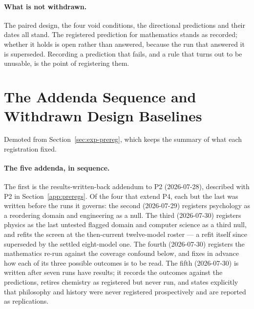 \paragraph{What is not withdrawn.} The paired design, the four void conditions,
the directional predictions and their dates all stand. The registered
prediction for mathematics stands as recorded; whether it holds is open rather
than answered, because the run that answered it is superseded. Recording a
prediction that fails, and a rule that turns out to be unusable, is the point of
registering them.

\section{The Addenda Sequence and Withdrawn Design Baselines}
\label{sec:app-addenda-record}

Demoted from Section~\ref{sec:exp-prereg}, which keeps the summary of
what each registration fixed.

\paragraph{The five addenda, in sequence.} The first is the
results-written-back addendum to P2 (2026-07-28), described with P2 in
Section~\ref{app:preregs}. Of the four that extend P4, each but the
last was written before the runs it governs: the second (2026-07-29)
registers psychology as a reordering domain and engineering as a null.
The third (2026-07-30) registers physics as the last untested flagged
domain and computer science as a third null, and refits the screen at
the then-current twelve-model roster --- a refit itself since
superseded by the settled eight-model one. The fourth (2026-07-30)
registers the mathematics re-run against the coverage confound below,
and fixes in advance how each of its three possible outcomes is to be
read. The fifth (2026-07-30) is written after seven runs have results;
it records the outcomes against the predictions, retires chemistry as
registered but never run, and states explicitly that philosophy and
history were never registered prospectively and are reported as
replications.

